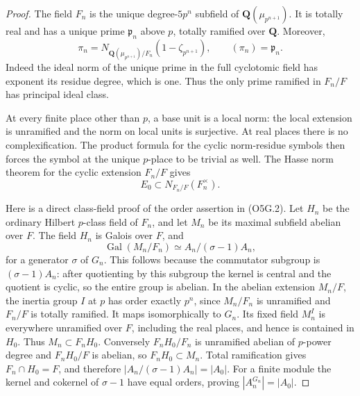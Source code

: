 \begin{proof}
The field $F_n$ is the unique degree-$5p^n$ subfield of
$\mathbf Q(\mu_{p^{n+1}})$.  It is totally real and has a unique
prime $\mathfrak p_n$ above $p$, totally ramified over $\mathbf Q$.
Moreover,
\[
 \pi_n=N_{\mathbf Q(\mu_{p^{n+1}})/F_n}
                       (1-\zeta_{p^{n+1}}),\qquad
                    (\pi_n)=\mathfrak p_n.              \tag{O5G.4}
\]
Indeed the ideal norm of the unique prime in the full cyclotomic
field has exponent its residue degree, which is one.  Thus the
only prime ramified in $F_n/F$ has principal ideal class.

At every finite place other than $p$, a base unit is a local norm:
the local extension is unramified and the norm on local units is
surjective.  At real places there is no complexification.
The product formula for the cyclic norm-residue symbols then
forces the symbol at the unique $p$-place to be trivial as well.
The Hasse norm theorem for the cyclic extension $F_n/F$ gives
\[
                    E_0\subset N_{F_n/F}(F_n^{\times}). \tag{O5G.5}
\]

Here is a direct class-field proof of the order assertion in
(O5G.2).  Let $H_n$ be the ordinary Hilbert $p$-class field of
$F_n$, and let $M_n$ be its maximal subfield abelian over $F$.
The field $H_n$ is Galois over $F$, and
\[
 \operatorname{Gal}(M_n/F_n)
       \simeq A_n/(\sigma-1)A_n,                       \tag{O5G.6}
\]
for a generator $\sigma$ of $G_n$.
This follows because the commutator subgroup is
$(\sigma-1)A_n$: after quotienting by this subgroup the kernel
is central and the quotient is cyclic, so the entire group is
abelian.  In the abelian extension $M_n/F$, the inertia group
$I$ at $p$ has order exactly $p^n$, since $M_n/F_n$ is
unramified and $F_n/F$ is totally ramified.  It maps
isomorphically to $G_n$.  Its fixed field $M_n^I$ is everywhere
unramified over $F$, including the real places, and hence is
contained in $H_0$.  Thus $M_n\subset F_nH_0$.
Conversely $F_nH_0/F_n$ is unramified abelian of $p$-power degree
and $F_nH_0/F$ is abelian, so $F_nH_0\subset M_n$.
Total ramification gives $F_n\cap H_0=F$, and therefore
$|A_n/(\sigma-1)A_n|=|A_0|$.
For a finite module the kernel and cokernel of $\sigma-1$
have equal orders, proving $|A_n^{G_n}|=|A_0|$.


\end{proof}
